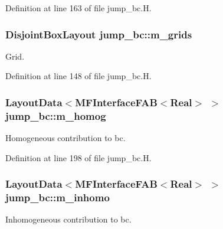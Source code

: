Definition at line 163 of file jump\+\_\+bc.\+H.

\subsubsection[{\texorpdfstring{m\+\_\+grids}{m_grids}}]{\setlength{\rightskip}{0pt plus 5cm}Disjoint\+Box\+Layout jump\+\_\+bc\+::m\+\_\+grids\hspace{0.3cm}{\ttfamily [protected]}}\hypertarget{classjump__bc_a0b157ff79e65adbc11bd935df99d8ab9}{}\label{classjump__bc_a0b157ff79e65adbc11bd935df99d8ab9}


Grid. 



Definition at line 148 of file jump\+\_\+bc.\+H.

\subsubsection[{\texorpdfstring{m\+\_\+homog}{m_homog}}]{\setlength{\rightskip}{0pt plus 5cm}Layout\+Data$<${\bf M\+F\+Interface\+F\+AB}$<$Real$>$ $>$ jump\+\_\+bc\+::m\+\_\+homog\hspace{0.3cm}{\ttfamily [protected]}}\hypertarget{classjump__bc_a359058d1b0cf39c13cd2fe79e0ec01d0}{}\label{classjump__bc_a359058d1b0cf39c13cd2fe79e0ec01d0}


Homogeneous contribution to bc. 



Definition at line 198 of file jump\+\_\+bc.\+H.

\subsubsection[{\texorpdfstring{m\+\_\+inhomo}{m_inhomo}}]{\setlength{\rightskip}{0pt plus 5cm}Layout\+Data$<${\bf M\+F\+Interface\+F\+AB}$<$Real$>$ $>$ jump\+\_\+bc\+::m\+\_\+inhomo\hspace{0.3cm}{\ttfamily [protected]}}\hypertarget{classjump__bc_af5f5b1aae63ae5c45f68e2a5dab25e65}{}\label{classjump__bc_af5f5b1aae63ae5c45f68e2a5dab25e65}


Inhomogeneous contribution to bc. 



